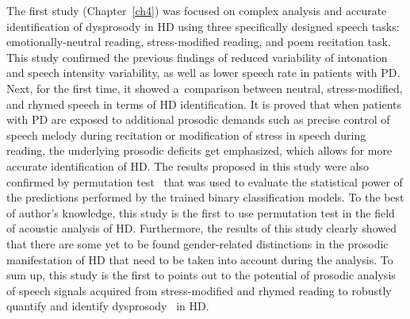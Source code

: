 The first study (Chapter~\ref{ch4}) was focused on complex analysis and accurate identification of dysprosody in HD using three specifically designed speech tasks: emotionally-neutral reading, stress-modified reading, and poem recitation task. This study confirmed the previous findings of reduced variability of intonation \cite{Canter1963, Metter1986, Flint1992, Goberman2005b, Goberman2005d, Rusz2011} and speech intensity \cite{Metter1986, Watson2008, Skodda2011c, Rusz2011, Clark2014} variability, as well as lower speech rate \cite{Weismer1984, Metter1986, Skodda2008, Skodda2011c} in patients with PD. Next, for the first time, it showed a~comparison between neutral, stress-modified, and rhymed speech in terms of HD identification. It is proved that when patients with PD are exposed to additional prosodic demands such as precise control of speech melody during recitation or modification of stress in speech during reading, the underlying prosodic deficits get emphasized, which allows for more accurate identification of HD. The results proposed in this study were also confirmed by permutation test~\cite{Phipson2010} that was used to evaluate the statistical power of the predictions performed by the trained binary classification models. To the best of author's knowledge, this study is the first to use permutation test in the field of acoustic analysis of HD. Furthermore, the results of this study clearly showed that there are some yet to be found gender-related distinctions in the prosodic manifestation of HD that need to be taken into account during the analysis. To sum up, this study is the first to points out to the potential of prosodic analysis of speech signals acquired from stress-modified and rhymed reading to robustly quantify and identify dysprosody~\cite{Galaz2016, Brabenec2017} in HD.

